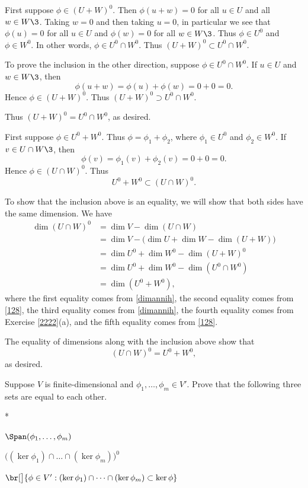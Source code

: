 \begin{Solution}
\begin{subtheorem}
\item
First suppose $\phi \in (U + W)^0\!$. Then $\phi(u + w) = 0$ for all $u \in U$ and all $w \in W\3$. Taking $w = 0$ and then taking $u = 0$, in particular we see that $\phi(u) = 0$ for all $u \in U$ and $\phi(w) = 0$ for all $w \in W\3$. Thus $\phi \in U^0$ and $\phi \in W^0\!$. In other words, $\phi \in U^0 \cap W^0\!$. Thus $(U + W)^0 \subset U^0 \cap W^0\!$.

To prove the inclusion in the other direction, suppose $\phi \in U^0 \cap W^0\!$. If $u \in U$ and $w \in W\3$, then
\[
\phi(u + w) = \phi(u) + \phi(w) = 0 + 0 = 0.
\]
Hence $\phi \in (U+W)^0\!$. Thus $(U + W)^0 \supset U^0 \cap W^0\!$.

Thus $(U + W)^0 = U^0 \cap W^0$, as desired.

\item
First suppose $\phi \in U^0 + W^0\!$. Thus $\phi = \phi_1 + \phi_2$, where $\phi_1 \in U^0$ and $\phi_2 \in W^0\!$. If $v \in U \cap W\3$, then
\[
\phi(v) = \phi_1(v) + \phi_2(v) = 0 + 0 = 0.
\]
Hence $\phi \in (U \cap W)^0\!$. Thus
\[
U^0 + W^0 \subset (U \cap W)^0\!.
\]

To show that the inclusion above is an equality, we will show that both sides have the same dimension. We have
\begin{align*}
\dim(U\cap W)^0 &= \dim V - \dim(U \cap W) \\
&= \dim V - \bigl(\dim U + \dim W - \dim(U+W) \bigr) \\
&= \dim U^0 + \dim W^0 - \dim(U+W)^0 \\
&= \dim U^0 + \dim W^0 - \dim(U^0 \cap W^0) \\
&= \dim( U^0 + W^0 ),
\end{align*}
where the first equality comes from \ref{dimannih}, the second equality comes from \ref{128}, the third equality comes from \ref{dimannih}, the fourth equality comes from Exercise \ref{2222}(a), and the fifth equality comes from \ref{128}.

The equality of dimensions along with the inclusion above show that
\[
(U \cap W)^0 = U^0 + W^0,
\]
as desired.
\end{subtheorem}
\end{Solution}

\exercise
Suppose $V$ is finite-dimensional and $\phi_1, \ldots, \phi_m \in V'\!$. Prove that the following three sets are equal to each other.\label{3intersectnull}
\begin{subtheorem}*
\item
$\Span(\phi_1, \dots, \phi_m)$
\item
$\bigl( (\ker \phi_1) \cap \dots \cap (\ker \phi_m)\bigr)^0$
\item
$\br[\big]{ \phi \in V': (\ker \phi_1) \cap \dots \cap (\ker \phi_m) \subset \ker \phi }$
\end{subtheorem}
\exercisesubtheoremend

